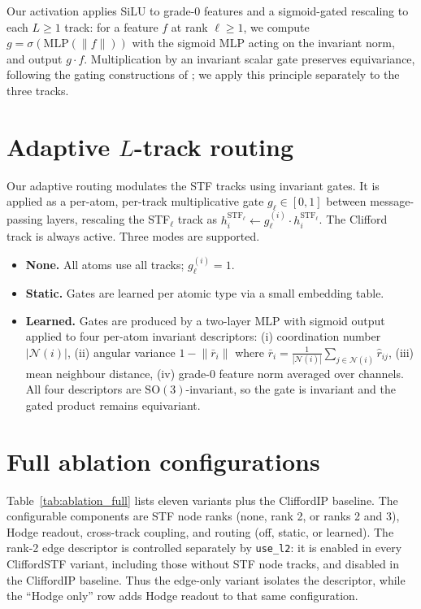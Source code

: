 Our activation applies SiLU \citep{elfwing2018silu} to grade-0 features and a sigmoid-gated rescaling to each $L \geq 1$ track: for a feature $f$ at rank $\ell \geq 1$, we compute $g = \sigma(\mathrm{MLP}(\lVert f\rVert))$ with the sigmoid MLP acting on the invariant norm, and output $g \cdot f$. Multiplication by an invariant scalar gate preserves equivariance, following the gating constructions of \citet{weiler20183d,schutt2021painn}; we apply this principle separately to the three tracks.

\section{Adaptive \texorpdfstring{$L$}{L}-track routing}\label{supp:routing}

Our adaptive routing modulates the STF tracks using invariant gates. It is applied as a per-atom, per-track multiplicative gate $g_\ell \in [0, 1]$ between message-passing layers, rescaling the STF$_\ell$ track as $h^{\mathrm{STF}_\ell}_i \leftarrow g_\ell^{(i)} \cdot h^{\mathrm{STF}_\ell}_i$. The Clifford track is always active. Three modes are supported.
\begin{itemize}
    \item \textbf{None.} All atoms use all tracks; $g_\ell^{(i)} = 1$.
    \item \textbf{Static.} Gates are learned per atomic type via a small embedding table.
    \item \textbf{Learned.} Gates are produced by a two-layer MLP with sigmoid output applied to four per-atom invariant descriptors: (i) coordination number $|\mathcal{N}(i)|$, (ii) angular variance $1 - \lVert\bar{r}_i\rVert$ where $\bar{r}_i = \tfrac{1}{|\mathcal{N}(i)|}\sum_{j\in\mathcal{N}(i)}\hat{r}_{ij}$, (iii) mean neighbour distance, (iv) grade-0 feature norm averaged over channels. All four descriptors are $\mathrm{SO}(3)$-invariant, so the gate is invariant and the gated product remains equivariant.
\end{itemize}

\section{Full ablation configurations}\label{supp:variants}

Table~\ref{tab:ablation_full} lists eleven variants plus the CliffordIP baseline. The configurable components are STF node ranks (none, rank 2, or ranks 2 and 3), Hodge readout, cross-track coupling, and routing (off, static, or learned). The rank-2 edge descriptor is controlled separately by \texttt{use\_l2}: it is enabled in every CliffordSTF variant, including those without STF node tracks, and disabled in the CliffordIP baseline. Thus the edge-only variant isolates the descriptor, while the ``Hodge only'' row adds Hodge readout to that same configuration.

